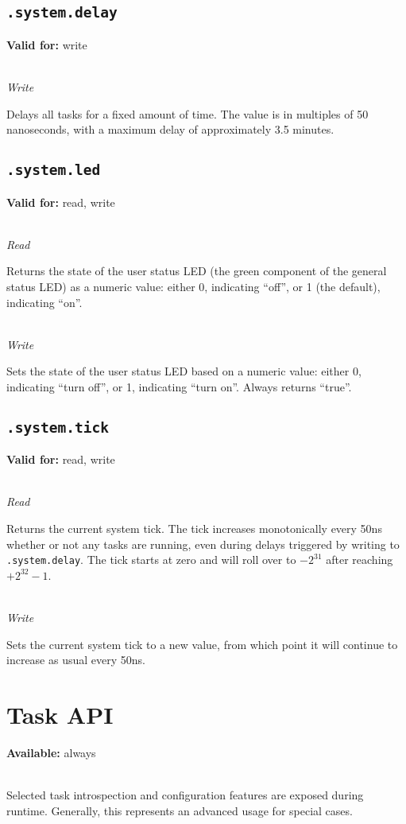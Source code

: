 \documentclass{article}
\begin{document}
\subsection{\texttt{.system.delay}}
\textbf{Valid for:} write

~\\
\textit{Write}

Delays all tasks for a fixed amount of time. The value is in multiples of 50 nanoseconds, with a maximum delay of approximately 3.5 minutes.

\subsection{\texttt{.system.led}}
\textbf{Valid for:} read, write

~\\
\textit{Read}

Returns the state of the user status LED (the green component of the general status LED) as a numeric value: either 0, indicating ``off'', or 1 (the default), indicating ``on''.

~\\
\textit{Write}

Sets the state of the user status LED based on a numeric value: either 0, indicating ``turn off'', or 1, indicating ``turn on''. Always returns ``true''.

\subsection{\texttt{.system.tick}}
\textbf{Valid for:} read, write

~\\
\textit{Read}

Returns the current system tick. The tick increases monotonically every 50ns whether or not any tasks are running, even during delays triggered by writing to \texttt{.system.delay}. The tick starts at zero and will roll over to $-2^{31}$ after reaching $+2^{32}-1$.

~\\
\textit{Write}

Sets the current system tick to a new value, from which point it will continue to increase as usual every 50ns.

\section{Task API}
\textbf{Available:} always

~\\
Selected task introspection and configuration features are exposed during runtime. Generally, this represents an advanced usage for special cases.
\end{document}
